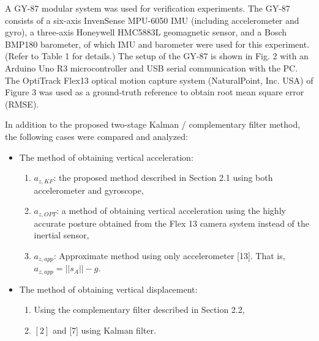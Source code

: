 \documentclass[10pt,journal,compsoc]{IEEEtran}
\begin{document}
A GY-87 modular system was used for verification experiments. The GY-87
consists of a six-axis InvenSense MPU-6050 IMU (including accelerometer and
gyro), a three-axis Honeywell HMC5883L geomagnetic sensor, and a Bosch BMP180
barometer, of which IMU and barometer were used for this experiment. (Refer to
Table 1 for details.)  The setup of the GY-87 is shown in Fig. 2 with an Arduino
Uno R3 microcontroller and USB serial communication with the
PC.  The OptiTrack Flex13 optical motion capture system
(NaturalPoint, Inc. USA) of Figure 3 was used as a ground-truth reference to obtain
root mean square error (RMSE).  

In addition to the proposed two-stage Kalman / complementary filter method,
the following cases were compared and analyzed:

\begin{itemize}
\item The method of obtaining vertical acceleration: 
\begin{enumerate}
\item $a_{z,KF}$: the proposed method described in Section 2.1 using both accelerometer and gyroscope,
\item $a_{z,OPT}$: a method of obtaining vertical acceleration using the highly
accurate posture obtained from the Flex 13 camera system instead of the inertial sensor,
\item $a_{z,app}$: Approximate method using only accelerometer [13]. That is, $a_{z,app} = ||s_A|| - g$.
\end{enumerate}
\item The method of obtaining vertical displacement:
\begin{enumerate}
\item Using the complementary filter described in Section 2.2,
\item $[2]$ and [7] using Kalman filter.
\end{enumerate}
\end{itemize}
\end{document}
